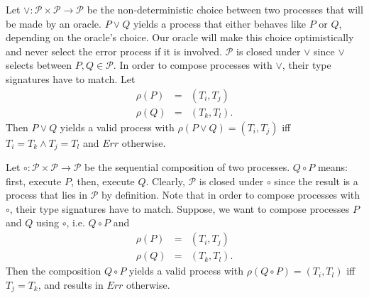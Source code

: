 Let $\vee \colon \mathcal{P} \times \mathcal{P} \to \mathcal{P}$ be the non-deterministic choice between two processes that will be made by an oracle. $P \vee Q$ yields a process that either behaves like $P$ or $Q$, depending on the oracle's choice. Our oracle will make this choice optimistically and never select the error process if it is involved. $\mathcal{P}$ is closed under $\vee$ since $\vee$ selects between $P, Q \in \mathcal{P}$. In order to compose processes with $\vee$, their type signatures have to match. Let
\begin{eqnarray*}
  \rho \left( P \right) & = & \left( T_i, T_j \right) \\
  \rho \left( Q \right) & = & \left( T_k, T_l \right).
\end{eqnarray*}
Then $P \vee Q$ yields a valid process with $\rho \left( P \vee Q \right) = \left( T_i, T_j \right)$ iff $T_i = T_k \wedge T_j = T_l$ and $Err$ otherwise. 


Let $\circ \colon \mathcal{P} \times \mathcal{P} \to \mathcal{P}$ be the sequential composition of two processes. $Q \circ P$ means: first, execute $P$, then, execute $Q$. Clearly, $\mathcal{P}$ is closed under $\circ$ since the result is a process that lies in $\mathcal{P}$ by definition. Note that in order to compose processes with $\circ$, their type signatures have to match. Suppose, we want to compose processes $P$ and $Q$ using $\circ$, i.e. $Q \circ P$ and
\begin{eqnarray*}
  \rho \left( P \right) & = & \left( T_i, T_j \right) \\
  \rho \left( Q \right) & = & \left( T_k, T_l \right).
\end{eqnarray*}
Then the composition $Q \circ P$ yields a valid process with $\rho \left( Q \circ P \right) = \left( T_i, T_l \right)$ iff $T_j = T_k$, and results in $Err$ otherwise. 


